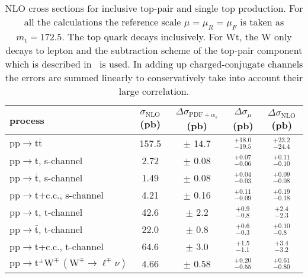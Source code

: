 \begin{table}[htb]
  \begin{center}
    \begin{tabular}{|l|c|c|c|c|}
      \hline
      
      process & $\sigma_{\mathrm{NLO}}$ (pb) & $\Delta\sigma_{\mathrm{PDF}+\alpha_s}$ (pb) & $\Delta\sigma_{\mu}$ (pb) & $\Delta\sigma_{\mathrm{NLO}}$ (pb) \\
      \hline
      $\mathrm{pp}\to\mathrm{t}\bar{\mathrm{t}}$ & 157.5 & $\pm$ 14.7 & $^{+18.0}_{-19.5}$ & $^{+23.2}_{-24.4}$ \\
      \hline
      \hline
       $\mathrm{pp}\to\mathrm{t}$, s-channel & 2.72 & $\pm$ 0.08 & $^{+0.07}_{-0.06}$ & $^{+0.11}_{-0.10}$ \\
       $\mathrm{pp}\to\bar{\mathrm{t}}$, s-channel & 1.49 & $\pm$ 0.08 & $^{+0.04}_{-0.03}$ & $^{+0.09}_{-0.08}$ \\
      \hline
       $\mathrm{pp}\to\mathrm{t}$+c.c., s-channel & 4.21 & $\pm$ 0.16 & $^{+0.11}_{-0.09}$ & $^{+0.19}_{-0.18}$ \\
      \hline
      \hline
       $\mathrm{pp}\to\mathrm{t}$, t-channel & 42.6 & $\pm$ 2.2 & $^{+0.9}_{-0.8}$ & $^{+2.4}_{-2.3}$ \\
       $\mathrm{pp}\to\bar{\mathrm{t}}$, t-channel & 22.0 & $\pm$ 0.8 & $^{+0.6}_{-0.3}$ & $^{+0.10}_{-0.8}$ \\
      \hline
       $\mathrm{pp}\to\mathrm{t}$+c.c., t-channel & 64.6 & $\pm$ 3.0 & $^{+1.5}_{-1.1}$ & $^{+3.4}_{-3.2}$ \\
      \hline
      \hline
       $\mathrm{pp}\to\mathrm{t}^\pm\mathrm{W}^\mp\,(\mathrm{W}^\mp\to\ell^\mp\nu)$ & 4.66 & $\pm$ 0.58 & $^{+0.20}_{-0.55}$ & $^{+0.61}_{-0.80}$ \\
      \hline
 
    \end{tabular}
    \caption{NLO cross sections for inclusive top-pair and single top production. 
      For all the calculations the reference scale $\mu=\mu_R=\mu_F$ is taken as $m_\mathrm{t}=172.5$. 
      The top quark decays inclusively. For Wt, the W only decays to lepton and the subtraction 
      scheme of the top-pair component which is described in~\cite{wt} is used. In adding up 
      charged-conjugate channels the errors are summed linearly to conservatively take into 
      account their large correlation.\label{tab:topnlo}}
  \end{center}
\end{table} 

